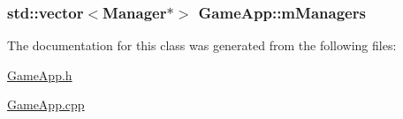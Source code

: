 \subsubsection[{\texorpdfstring{m\+Managers}{mManagers}}]{\setlength{\rightskip}{0pt plus 5cm}std\+::vector$<${\bf Manager}$\ast$$>$ Game\+App\+::m\+Managers\hspace{0.3cm}{\ttfamily [private]}}\hypertarget{classGameApp_a05eea8d694f5a44959b372acca074986}{}\label{classGameApp_a05eea8d694f5a44959b372acca074986}


The documentation for this class was generated from the following files\+:\begin{DoxyCompactItemize}
\item 
\hyperlink{GameApp_8h}{Game\+App.\+h}\item 
\hyperlink{GameApp_8cpp}{Game\+App.\+cpp}\end{DoxyCompactItemize}
